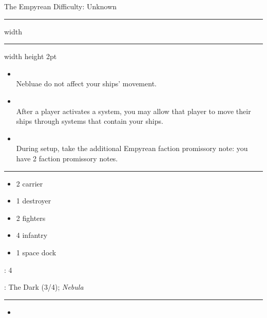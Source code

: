 {\handel\Huge The Empyrean} \hfill {\Large Difficulty: Unknown} \vspace{-4pt}\\
\hrule width \hsize \kern 1mm \hrule width \hsize height 2pt


\begin{multicols}{2}


\begin{itemize}
\item {}\\
Nebluae do not affect your ships' movement.
\item {}\\
After a player activates a system, you may allow that player to move their ships through systems that contain your ships.
\item {}\\
During setup, take the additional Empyrean faction promissory note: you have 2 faction promissory notes.
\end{itemize}


\vspace{-10pt}\rule{\hsize}{0.4pt}\vspace{5pt}


\vspace{-5pt}
\begin{multicols}{2}
\begin{itemize}
\item 2 carrier
\item 1 destroyer
\item 2 fighters
\item 4 infantry
\item 1 space dock
\end{itemize}
\end{multicols}

\vspace{-5pt}
: 4

\vspace{2pt}
: The Dark (3/4); \emph{Nebula}

\rule{\hsize}{0.4pt}\vspace{5pt}


\begin{itemize}
\item \tap
\end{itemize}


\end{multicols}
